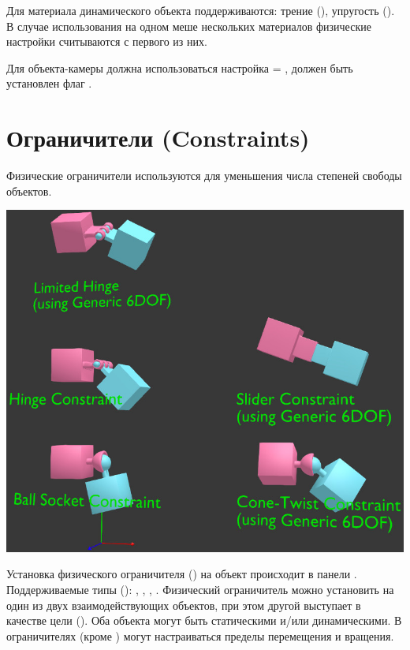 \documentclass[a4paper,12pt,oneside]{sphinxmanual}
\begin{document}
\begin{DUlineblock}{0em}
\item[] 
\end{DUlineblock}

Для материала динамического объекта поддерживаются: трение (), упругость (). В случае использования на одном меше нескольких материалов физические настройки считываются с первого из них.

Для объекта-камеры должна использоваться настройка  = , должен быть установлен флаг .


\section{Ограничители (Constraints)}
\label{physics:constraints}
Физические ограничители используются для уменьшения числа степеней свободы объектов.

\includegraphics[width=1.000\linewidth]{physics_constraints.jpg}

\begin{DUlineblock}{0em}
\item[] 
\end{DUlineblock}

Установка физического ограничителя () на объект происходит в панели . Поддерживаемые типы (): , , , . Физический ограничитель можно установить на один из двух взаимодействующих объектов, при этом другой выступает в качестве цели (). Оба объекта могут быть статическими и/или динамическими. В ограничителях (кроме ) могут настраиваться пределы перемещения и вращения.
\end{document}
